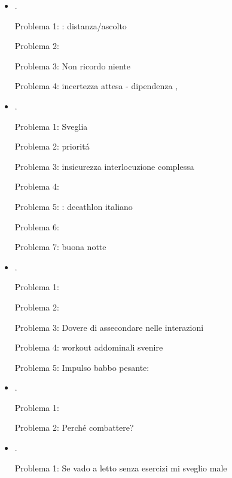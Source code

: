 \begin{itemize}
Problema 7:  - fare con babbo

Problema 8: non riesco a mantenere equilibrio durante workout


\item {}.

Problema 1: : distanza/ascolto

Problema 2: 

Problema 3: Non ricordo niente

Problema 4: incertezza attesa - dipendenza , 


\item {}.

Problema 1: Sveglia

Problema 2: priorit\'a

Problema 3: insicurezza interlocuzione complessa

Problema 4: 

Problema 5: : decathlon italiano

Problema 6: 

Problema 7: buona notte

\item {}.

Problema 1: 

Problema 2: 

Problema 3: Dovere di assecondare nelle interazioni

Problema 4: workout addominali svenire

Problema 5: Impulso babbo pesante: 

\item {}.

Problema 1: 

Problema 2: Perch\'e combattere?

\item {}.

Problema 1: Se vado a letto senza esercizi mi sveglio male


\end{itemize}
